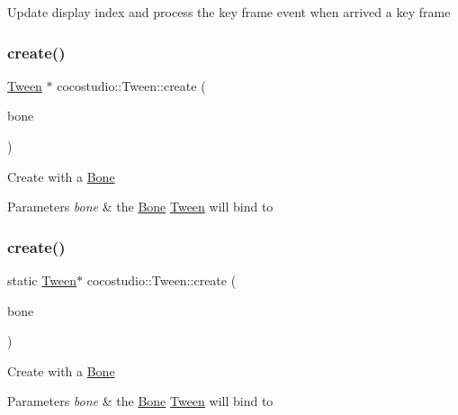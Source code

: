 Update display index and process the key frame event when arrived a key frame \mbox{\label{classcocostudio_1_1Tween_aebcfa6470c9ce925159d7096bb144827}} 
\subsubsection{\texorpdfstring{create()}{create()}\hspace{0.1cm}{\footnotesize\ttfamily [1/2]}}
{\footnotesize\ttfamily \hyperlink{classcocostudio_1_1Tween}{Tween} $\ast$ cocostudio\+::\+Tween\+::create (\begin{DoxyParamCaption}\item[{\hyperlink{classcocostudio_1_1Bone}{Bone} $\ast$}]{bone }\end{DoxyParamCaption})\hspace{0.3cm}{\ttfamily [static]}}

Create with a \hyperlink{classcocostudio_1_1Bone}{Bone} 
\begin{DoxyParams}{Parameters}
{\em bone} & the \hyperlink{classcocostudio_1_1Bone}{Bone} \hyperlink{classcocostudio_1_1Tween}{Tween} will bind to \\
\hline
\end{DoxyParams}
\mbox{\label{classcocostudio_1_1Tween_a36fbe5ae4133df267d4054cf6106c7d2}} 
\subsubsection{\texorpdfstring{create()}{create()}\hspace{0.1cm}{\footnotesize\ttfamily [2/2]}}
{\footnotesize\ttfamily static \hyperlink{classcocostudio_1_1Tween}{Tween}$\ast$ cocostudio\+::\+Tween\+::create (\begin{DoxyParamCaption}\item[{\hyperlink{classcocostudio_1_1Bone}{Bone} $\ast$}]{bone }\end{DoxyParamCaption})\hspace{0.3cm}{\ttfamily [static]}}

Create with a \hyperlink{classcocostudio_1_1Bone}{Bone} 
\begin{DoxyParams}{Parameters}
{\em bone} & the \hyperlink{classcocostudio_1_1Bone}{Bone} \hyperlink{classcocostudio_1_1Tween}{Tween} will bind to \\
\hline
\end{DoxyParams}
\mbox{\label{classcocostudio_1_1Tween_afca0d0866505e0a3c747277c1df8a69d}} 
